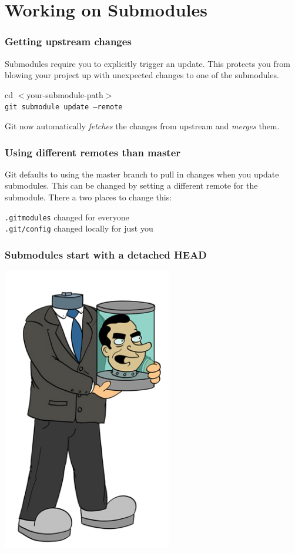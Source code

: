 \documentclass[10pt]{beamer}
\begin{document}
\section{Working on Submodules}

\begin{frame}[fragile]
  \frametitle{Getting upstream changes}
   Submodules require you to  \alert{explicitly} trigger an update.
   This protects you from blowing your project up with unexpected changes to one of the submodules.    
  \begin{center}cd $<$your-submodule-path$>$\\ \texttt{git submodule update --remote} \end{center}
  
  Git now automatically \emph{fetches} the changes from upstream and \emph{merges} them.

\end{frame}

\begin{frame}[fragile]
  \frametitle{Using different remotes than master}
  Git defaults to using the master branch to pull in changes when you update submodules.
  This can be changed by setting a different remote for the submodule. There a two places to change this:
\begin{center} 
  \texttt{.gitmodules} changed for everyone \\
  \texttt{.git/config} changed locally for just you
\end{center}
\end{frame}

\begin{frame}
\frametitle{Submodules start with a detached HEAD}
 \begin{center}
 \includegraphics[width=280px]{images/nixon.jpg}
 \end{center}
\end{frame}
\end{document}
